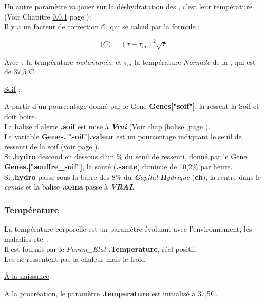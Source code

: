 \documentclass[french]{report}
\newlength{\du}\fi
\begin{document}
Un autre paramètre va jouer sur la déshydratation des \CoCiX, c'est leur température (Voir Chapitre \ref{temperature} page \pageref{temperature}):\\
Il y a un facteur de correction $\mathcal{C}$, qui se calcul par la formule :

\[ \mathcal(C) = (\tau - \tau_m)^2\sqrt{\tau} \]

Avec $\tau$ la température \textit{instantanée}, et $\tau_m$ la température \textit{Normale} de la \CoCiX, qui est de 37,5 \degres C.\\

\begin{center}
	\underline{Soif} :\label{soif}
\end{center}
A partir d'un pourcentage donné par le Gene \textbf{Genes["soif"]}, la \CoCiX ressent la Soif et doit boire.\\
La balise d'alerte \textbf{.soif} est mise à \textbf{\textit{Vrai}} (Voir chap \ref{balise} page \pageref{balise}).\\
La variable \textbf{Genes.["soif"].valeur} est un pourcentage indiquant le seuil de ressenti de la soif (voir page \pageref{liste_gene}).\\


Si \textbf{.hydro} descend en dessous d'un \% du seuil de ressenti, donné par le Gene \textbf{Genes.["souffre\_soif"]}, la santé (\textbf{.sante}) diminue de 10,2\% par heure.\\

Si \textbf{.hydro} passe sous la barre des 8\% du \textit{\textbf{C}apital \textbf{H}ydrique} (\textbf{ch}), la \CoCiX rentre dans le \textit{comas} et la balise \textbf{.coma} passe à \textit{\textbf{VRAI}}.


\subsubsection{Température}\label{temperature}
La température corporelle est un paramètre évoluant avec l'environnement, les maladies etc...\\
Il est fournit par le \textit{Param\_Etat} \textbf{.Temperature}, réel positif.\\
Les \CoCiX ne ressentent pas la chaleur mais le froid.

\begin{center}
	\underline{À la naissance}
\end{center}
A la procréation, le paramètre \textbf{.temperature} est initialisé à 37,5\degres C.\\
\end{document}
